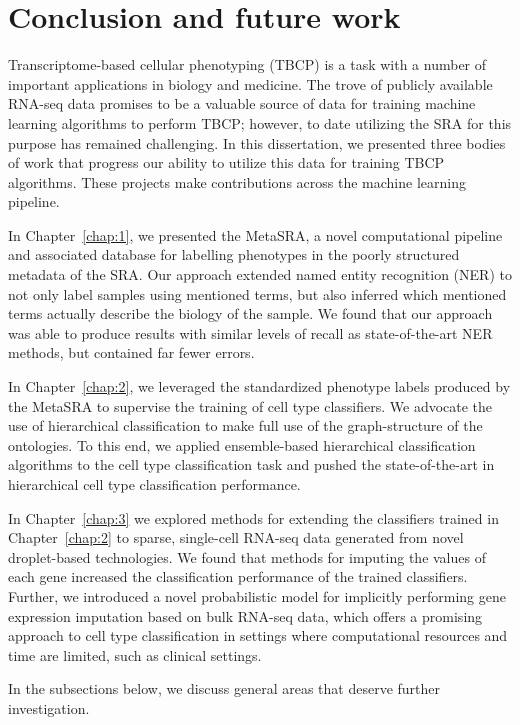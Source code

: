 \chapter{Conclusion and future work } \label{chap:future}

Transcriptome-based cellular phenotyping (TBCP) is a task with a number of important applications in biology and medicine.  The trove of publicly available RNA-seq data promises to be a valuable source of data for training machine learning algorithms to perform TBCP; however, to date utilizing the SRA for this purpose has remained challenging.  In this dissertation, we presented three bodies of work that progress our ability to utilize this data for training TBCP algorithms.  These projects make contributions across the machine learning pipeline. 

 In Chapter~\ref{chap:1}, we presented the MetaSRA, a novel computational pipeline and associated database for labelling phenotypes in the poorly structured metadata of the SRA.  Our approach extended named entity recognition (NER) to not only label samples using mentioned terms, but also inferred which mentioned terms actually describe the biology of the sample. We found that our approach was able to produce results with similar levels of recall as state-of-the-art NER methods, but contained far fewer errors. 
  
 In Chapter~\ref{chap:2}, we leveraged the standardized phenotype labels produced by the MetaSRA to supervise the training of cell type classifiers.  We advocate the use of hierarchical classification to make full use of the graph-structure of the ontologies. To this end, we applied ensemble-based hierarchical classification algorithms to the cell type classification task and pushed the state-of-the-art in hierarchical cell type classification performance.  
 
In Chapter~\ref{chap:3} we explored methods for extending the classifiers trained in Chapter~\ref{chap:2} to sparse, single-cell RNA-seq data generated from novel droplet-based technologies. We found that methods for imputing the values of each gene increased the classification performance of the trained classifiers. Further, we introduced a novel probabilistic model for implicitly performing gene expression imputation based on bulk RNA-seq data, which offers a promising approach to cell type classification in settings where computational resources and time are limited, such as clinical settings.

In the subsections below, we discuss general areas that deserve further investigation.

